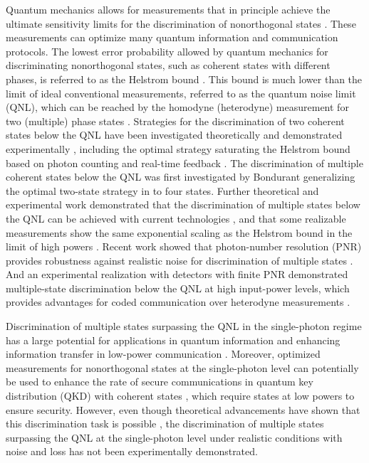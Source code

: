 \documentclass[twocolumn,pra,preprintnumbers,amsmath,amssymb,superscriptaddress,floatfix]{revtex4}%
\begin{document}
Quantum mechanics allows for measurements that in principle achieve
the ultimate sensitivity limits for the discrimination of
nonorthogonal states \cite{helstrom76, yuen75}. These measurements can optimize
many quantum information and communication protocols. The lowest
error probability allowed by quantum mechanics for discriminating
nonorthogonal states, such as coherent states with different phases,
is referred to as the Helstrom bound \cite{helstrom76}. This bound
is much lower than the limit of ideal conventional
measurements, referred to as the quantum noise limit (QNL), which
can be reached by the homodyne (heterodyne) measurement
for two (multiple) phase states \cite{weedbrook12}. Strategies for the discrimination
of two coherent states below the QNL have
been investigated theoretically \cite{kennedy72,taeoka08,dolinar73}
and demonstrated experimentally \cite{cook07, wittman08, tsujino11},
including the optimal strategy saturating the Helstrom bound
\cite{dolinar73} based on photon counting and real-time feedback
\cite{cook07}. The discrimination of multiple coherent states below
the QNL was first investigated by Bondurant \cite{bondurant93}
generalizing the optimal two-state strategy in \cite{dolinar73} to
four states. Further theoretical \cite{nair12,izumi12,izumi13,li13,
muller15} and experimental work demonstrated that the discrimination
of multiple states below the QNL \cite{muller12} can be achieved
with current technologies \cite{becerra13}, and that some realizable
measurements show the same exponential scaling as the Helstrom bound
in the limit of high powers \cite{bondurant93, izumi12, nair12}.
Recent work showed that photon-number resolution (PNR) provides
robustness against realistic noise for discrimination of multiple
states \cite{izumi13,li13}. And an experimental realization with
detectors with finite PNR demonstrated multiple-state discrimination
below the QNL at high input-power levels, which provides advantages
for coded communication over heterodyne measurements
\cite{becerra15}.

Discrimination of multiple states surpassing the QNL in the
single-photon regime has a large potential for applications in
quantum information
\cite{vanloock06,vanloock08,munro05,nemoto04,ralph03} and enhancing
information transfer in low-power communication \cite{becerra15,
rosati16, lee16, tan15}. Moreover, optimized measurements for
nonorthogonal states at
the single-photon level can potentially be used to enhance the rate
of secure communications in quantum key distribution (QKD) with
coherent states \cite{wittmann10, leverrier09,leverrier11, sych10}, which
require states at low powers to ensure security.
However, even though theoretical advancements have shown that this
discrimination task is possible \cite{muller15}, the discrimination
of multiple states surpassing the QNL at the single-photon level under realistic
conditions with noise and loss has not been experimentally
demonstrated.
\end{document}
